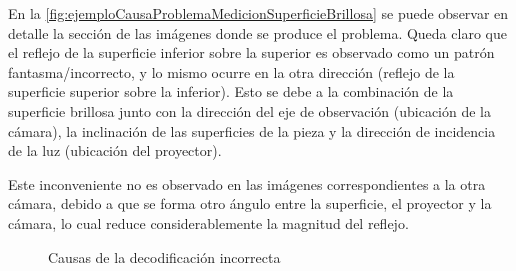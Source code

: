 En la \autoref{fig:ejemploCausaProblemaMedicionSuperficieBrillosa} se puede observar en detalle la sección de las imágenes donde se produce el problema. Queda claro que el reflejo de la superficie inferior sobre la superior es observado como un patrón fantasma/incorrecto, y lo mismo ocurre en la otra dirección (reflejo de la superficie superior sobre la inferior). Esto se debe a la combinación de la superficie brillosa junto con la dirección del eje de observación (ubicación de la cámara), la inclinación de las superficies de la pieza y la dirección de incidencia de la luz (ubicación del proyector). 

Este inconveniente no es observado en las imágenes correspondientes a la otra cámara, debido a que se forma otro ángulo entre la superficie, el proyector y la cámara, lo cual reduce considerablemente la magnitud del reflejo. 

\begin{figure}[!bth]
    \myfloatalign
        \caption{Causas de la decodificación incorrecta}
        \label{fig:ejemploCausaProblemaMedicionSuperficieBrillosa}
\end{figure}

